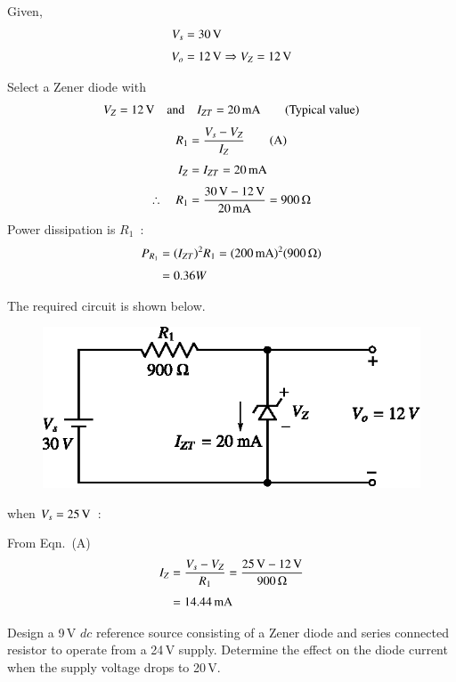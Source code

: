 \begin{solution}
Given,
\begin{align*}
V_{s} &= 30\text{\,V}\\[3pt]
V_{o} &= 12\text{\,V}\Rightarrow V_{Z}=12\text{\,V}
\end{align*}

Select a Zener diode with
$$
V_{Z}=12\text{\,V}\quad\text{and}\quad I_{ZT}=20\text{\,mA}\qquad\text{(Typical value)}
$$
\begin{align*}
R_{1} &= \frac{V_{s}-V_{Z}}{I_{Z}}\tag{A}\\[3pt]
I_{Z} &= I_{ZT}=20\text{\,mA}\\[3pt]
\therefore\quad R_{1} &= \frac{30\text{\,V}-12\text{\,V}}{20\text{\,mA}}=900\,\Omega
\end{align*}
Power dissipation is $R_{1}$~:
\begin{align*}
P_{R_{1}} &= (I_{ZT})^{2}R_{1}=(200\text{\,mA})^{2}(900\,\Omega)\\[3pt]
&= 0.36W
\end{align*}

\eject

The required circuit is shown below.
\begin{figure}[H]
\centering
\includegraphics{chap2/sol2.26.eps}
\end{figure}

\noindent
when $V_{s}=25\text{\,V}$~:

From Eqn.~(A)
\begin{align*}
I_{Z} &= \frac{V_{s}-V_{Z}}{R_{1}}=\dfrac{25\text{\,V}-12\text{\,V}}{900\,\Omega}\\[3pt]
&= 14.44\text{\,mA}
\end{align*}
\end{solution}

\begin{example}\label{exam2.26}
Design a 9\,V $dc$ reference source consisting of a Zener diode and series connected resistor to operate from a 24\,V supply. Determine the effect on the diode current when the supply voltage drops to 20\,V.
\end{example}

